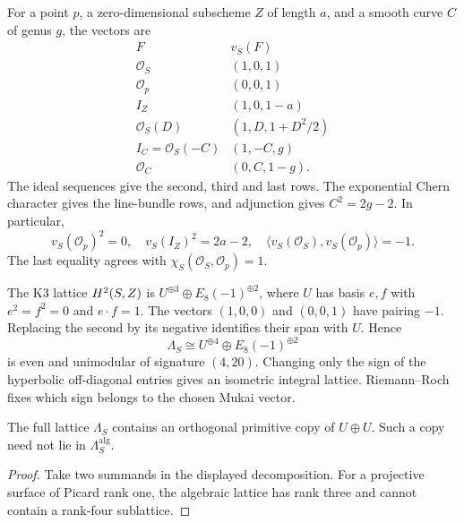 \begin{example}
\label{ex:mukai-vector-point-and-ideal}
For a point $p$, a zero-dimensional subscheme $Z$ of length $a$, and
a smooth curve $C$ of genus $g$, the vectors are
\[
\begin{array}{c|c}
F&v_S(F)\\ \hline
\mathcal O_S&(1,0,1)\\
\mathcal O_p&(0,0,1)\\
I_Z&(1,0,1-a)\\
\mathcal O_S(D)&(1,D,1+D^2/2)\\
I_C=\mathcal O_S(-C)&(1,-C,g)\\
\mathcal O_C&(0,C,1-g).
\end{array}
\]
The ideal sequences give the second, third and last rows.  The
exponential Chern character gives the line-bundle rows, and
adjunction gives $C^2=2g-2$.  In particular,
\[
v_S(\mathcal O_p)^2=0,\quad v_S(I_Z)^2=2a-2,\quad
\langle v_S(\mathcal O_S),v_S(\mathcal O_p)\rangle=-1.
\]
The last equality agrees with $\chi_S(\mathcal O_S,\mathcal O_p)=1$.
\end{example}

\begin{remark}
\label{rem:mukai-sign-convention}
The K3 lattice $H^2(S,Z)$ is
$U^{\oplus3}\oplus E_8(-1)^{\oplus2}$, where $U$ has basis $e,f$ with
$e^2=f^2=0$ and $e\cdot f=1$.  The vectors $(1,0,0)$ and $(0,0,1)$
have pairing $-1$.  Replacing the second by its negative identifies
their span with $U$.  Hence
\[
\Lambda_S\cong U^{\oplus4}\oplus E_8(-1)^{\oplus2}
\]
is even and unimodular of signature $(4,20)$.
Changing only the sign of the hyperbolic off-diagonal entries gives
an isometric integral lattice.  Riemann--Roch fixes which sign belongs
to the chosen Mukai vector.
\end{remark}

\begin{lemma}
\label{lem:two-hyperbolic-planes}
The full lattice $\Lambda_S$ contains an orthogonal primitive copy of
$U\oplus U$.  Such a copy need not lie in $\Lambda_S^{\mathrm{alg}}$.
\end{lemma}

\begin{proof}
Take two summands in the displayed decomposition.  For a projective
surface of Picard rank one, the algebraic lattice has rank three and
cannot contain a rank-four sublattice.
\end{proof}

